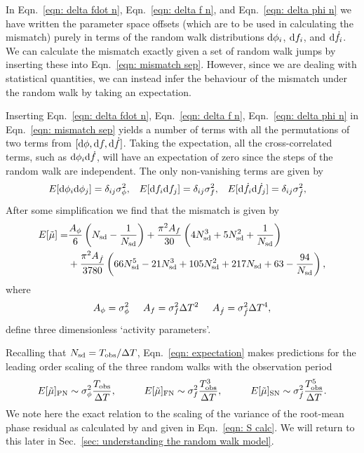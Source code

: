 \documentclass[../full_thesis/full_thesis.tex]{subfiles}
\begin{document}
In Eqn.~\eqref{eqn: delta fdot n}, Eqn.~\eqref{eqn: delta f n},
and Eqn.~\eqref{eqn: delta phi n} we have written the parameter space offsets
(which are to be used in calculating the mismatch) purely in terms of the
random walk distributions $\mathrm{d} \phi_i$, $\mathrm{d} f_i$, and $\mathrm{d} \dot{f}_i$. We can
calculate the mismatch exactly given a set of random walk jumps by inserting
these into Eqn.~\eqref{eqn: mismatch sep}. However, since we are dealing with
statistical quantities, we can instead infer the behaviour of the mismatch
under the random walk by taking an expectation.

Inserting Eqn.~\eqref{eqn: delta fdot n}, Eqn.~\eqref{eqn: delta f n},
Eqn.~\eqref{eqn: delta phi n}  in Eqn.~\eqref{eqn: mismatch sep} yields a
number of terms with all the permutations of two terms from $[\mathrm{d} \phi, \mathrm{d} f,
\mathrm{d} \dot{f}]$. Taking the expectation, all the cross-correlated terms, such as
$\mathrm{d}\phi_{i}\mathrm{d} \dot{f}$, will have an expectation of zero since the steps of the
random walk are independent. The only non-vanishing terms are given by
\begin{align}
E[\mathrm{d}\phi_{i}\mathrm{d}\phi_{j}] &= \delta_{ij}\sigma_{\phi}^{2}, &
E[\mathrm{d}f_{i}\mathrm{d}f_{j}] &= \delta_{ij}\sigma_{f}^{2},&
E[\mathrm{d}\dot{f}_{i}\mathrm{d}\dot{f}_{j}] &= \delta_{ij}\sigma_{\dot{f}}^{2},
\end{align}
After some simplification we find that the mismatch is given by
\begin{align}
\begin{split}
E[\tilde{\mu}]   = &  \frac{A_{\phi}}{6} \left(N_{\textrm{sd}} - \frac{1}{N_{\textrm{sd}}}\right)
+ \frac{\pi^{2} A_{{f}}}{30}\left(4 N_{\textrm{sd}}^{3} + 5 N_{\textrm{sd}}^{2} + \frac{1}{N_{\textrm{sd}}}\right)\\
 & +  \frac{\pi^{2} A_{{\dot{f}}}}{3780} \left(66 N_{\textrm{sd}}^{5} - 21 N_{\textrm{sd}}^{3} + 105 N_{\textrm{sd}}^{2}
 + 217 N_{\textrm{sd}} + 63 - \frac{94}{N_{\textrm{sd}}}\right),
\end{split}
\label{eqn: expectation}
\end{align}
where
\begin{equation}
	A_{\phi} = \sigma_{\phi}^{2} \;\;\;\;\;
    A_{f} = \sigma_{f}^{2}\Delta T^{2} \;\;\;\;\;
    A_{\dot{f}} = \sigma_{\dot{f}}^{2}\Delta T^{4},
\end{equation}
define three dimensionless `activity parameters'.

Recalling that $N_{\textrm{sd}}=T_{\mathrm{obs}}/\Delta T$, Eqn.~\eqref{eqn: expectation} makes
predictions for the leading order
scaling of the three random walks with the observation period
\begin{equation}
E[\mutilde]_{\mathrm{PN}} \sim \sigP \frac{\Tobs}{\Delta T}, \hspace{10mm}
E[\mutilde]_{\mathrm{FN}} \sim \sigF \frac{\Tobs^{3}}{\Delta T}, \hspace{10mm}
E[\mutilde]_{\mathrm{SN}} \sim \sigS \frac{\Tobs^{5}}{\Delta T}.
\label{eqn: scalings}
\end{equation}
We note here the exact relation to the scaling of the variance of the
root-mean phase residual as calculated by \citet{Cordes1980} and given in
Eqn.~\eqref{eqn: S calc}. We will return to this later in Sec.~\ref{sec: understanding the random walk model}.
\end{document}
